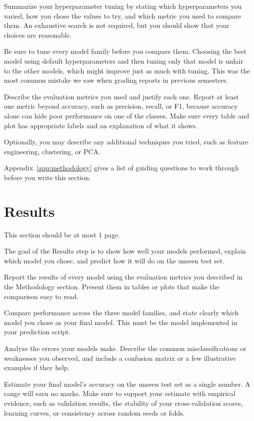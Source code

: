 \documentclass[12pt]{article}
\begin{document}
Summarize your hyperparameter tuning by stating which hyperparameters you varied, how you chose the values to try, and which metric you used to compare them. An exhaustive search is not required, but you should show that your choices are reasonable.

Be sure to tune every model family before you compare them. Choosing the best model using default hyperparameters and then tuning only that model is unfair to the other models, which might improve just as much with tuning. This was the most common mistake we saw when grading reports in previous semesters.

Describe the evaluation metrics you used and justify each one. Report at least one metric beyond accuracy, such as precision, recall, or F1, because accuracy alone can hide poor performance on one of the classes. Make sure every table and plot has appropriate labels and an explanation of what it shows.

Optionally, you may describe any additional techniques you tried, such as feature engineering, clustering, or PCA.

Appendix~\ref{app:methodology} gives a list of guiding questions to work through before you write this section.

\section{Results}\label{sec:results}

This section should be at most 1 page.

The goal of the Results step is to show how well your models performed, explain which model you chose, and predict how it will do on the unseen test set.

Report the results of every model using the evaluation metrics you described in the Methodology section. Present them in tables or plots that make the comparison easy to read.

Compare performance across the three model families, and state clearly which model you chose as your final model. This must be the model implemented in your prediction script.

Analyze the errors your models make. Describe the common misclassifications or weaknesses you observed, and include a confusion matrix or a few illustrative examples if they help.

Estimate your final model's accuracy on the unseen test set as a single number. A range will earn no marks. Make sure to support your estimate with empirical evidence, such as validation results, the stability of your cross-validation scores, learning curves, or consistency across random seeds or folds.
\end{document}

